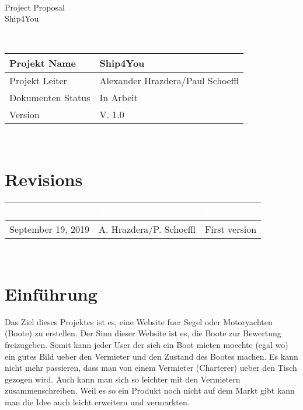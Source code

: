 \documentclass[12pt]{article}
\theoremstyle{definition}
\newcommand{\projectname}{Ship4You}
\newcommand{\productname}{Ship4You}
\newcommand{\projectleader}{Alexander Hrazdera/Paul Schoeffl}
\newcommand{\documentstatus}{In Arbeit}
\newcommand{\version}{V. 1.0}
\begin{document}
\begin{titlepage}
​
\vspace{10em}
​
\begin{center}
{\Huge Project Proposal} \\[3em]
{\LARGE \productname} \\[3em]
\end{center}
​
\begin{flushleft} 
\begin{tabular}{|l|l|}
\hline
Projekt Name & \projectname \\ \hline
Projekt Leiter & \projectleader \\ \hline
Dokumenten Status & \documentstatus \\ \hline
Version & \version \\ \hline
\end{tabular}
\end{flushleft}
​
\end{titlepage}
\section*{Revisions}
\begin{tabular}{|l|l|l|}
\hline
\cellcolor[gray]{0.5}\textcolor{white}{Date} & \cellcolor[gray]{0.5}\textcolor{white}{Author} & \cellcolor[gray]{0.5}\textcolor{white}{Change} \\ \hline
September 19, 2019&A. Hrazdera/P. Schoeffl&First version \\ \hline
\end{tabular}
​
\pagebreak
​
\tableofcontents
​
\pagebreak
​
\section{Einführung}
Das Ziel dieses Projektes ist es, eine Website fuer Segel oder Motoryachten (Boote) zu erstellen. Der Sinn dieser Website ist es, die Boote zur Bewertung freizugeben. Somit kann jeder User der sich ein Boot mieten moechte (egal wo) ein gutes Bild ueber den Vermieter und den Zustand des Bootes machen. Es kann nicht mehr passieren, dass man von einem Vermieter (Charterer) ueber den Tisch gezogen wird. Auch kann man sich so leichter mit den Vermietern zusammenschreiben. Weil es so ein Produkt noch nicht auf dem Markt gibt kann man die Idee auch leicht erweitern und vermarkten. 
​
\pagebreak
​
\end{document}
